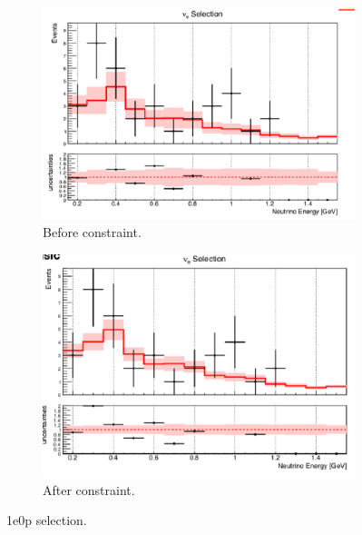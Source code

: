 \begin{figure}[H] 
\begin{center}
    \begin{subfigure}[b]{0.45\textwidth}
    \centering
    \includegraphics[width=1.00\textwidth]{Fakedata/set2/zp_before_constrain.pdf}
    \caption{\label{fig:fakedata:set2:zp_before_constrain} Before constraint.}
    \end{subfigure}
    \begin{subfigure}[b]{0.45\textwidth}
    \centering
    \includegraphics[width=1.00\textwidth]{Fakedata/set2/zp_after_constrain.pdf}
    \caption{\label{fig:fakedata:set2:zp_after_constrain} After constraint.}
    \end{subfigure}
\caption{\label{fig:fakedata:set2:zp_const} 1e0p selection.}
\end{center}
\end{figure}

